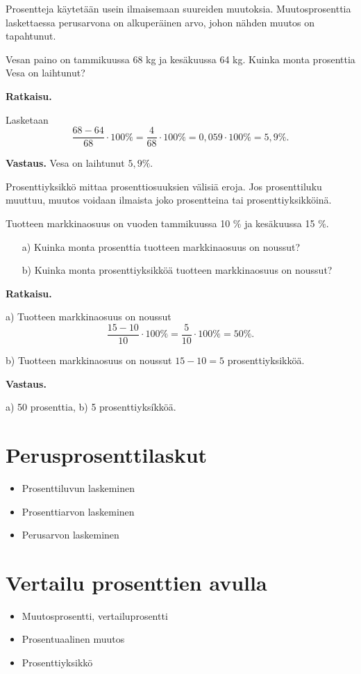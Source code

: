 Prosentteja käytetään usein ilmaisemaan suureiden muutoksia. Muutosprosenttia laskettaessa perusarvona on alkuperäinen arvo, johon nähden muutos on tapahtunut.

\begin{esimerkki}
    Vesan paino on tammikuussa 68 kg ja kesäkuussa 64 kg. Kuinka monta prosenttia Vesa on laihtunut?

    {\bf Ratkaisu.}

    Lasketaan 
    \[
    \frac{68-64}{68}\cdot 100\% = \frac{4}{68} \cdot 100\%=0,059\cdot 100\% =5,9\%.
    \]
    
    {\bf Vastaus.}
    Vesa on laihtunut $5,9\%$.
\end{esimerkki}


Prosenttiyksikkö mittaa prosenttiosuuksien välisiä eroja. Jos prosenttiluku muuttuu, muutos voidaan ilmaista joko prosentteina tai prosenttiyksikköinä.


\begin{esimerkki}
    Tuotteen markkinaosuus on vuoden tammikuussa 10 \% ja kesäkuussa 15 \%. 
    \begin{enumerate}
    \item[a)]
    Kuinka monta prosenttia tuotteen markkinaosuus on noussut?
    
    \item[b)] Kuinka monta prosenttiyksikköä tuotteen markkinaosuus on noussut?
    \end{enumerate}
    
    {\bf Ratkaisu.} 
    
    a) Tuotteen markkinaosuus on noussut
    \[
    \frac{15-10}{10} \cdot 100 \%= \frac{5}{10}\cdot 100\% = 50\%.
    \]
    
    b) Tuotteen markkinaosuus on noussut $15-10=5$ prosenttiyksikköä. 
    
    {\bf Vastaus.}
    
    a) 50 prosenttia, b) 5 prosenttiyksíkköä.
\end{esimerkki}




\section{Perusprosenttilaskut}

\begin{itemize}
	\item Prosenttiluvun laskeminen
	\item Prosenttiarvon laskeminen
	\item Perusarvon laskeminen
\end{itemize}

\section{Vertailu prosenttien avulla}

\begin{itemize}
	\item Muutosprosentti, vertailuprosentti
	\item Prosentuaalinen muutos
	\item Prosenttiyksikkö
\end{itemize}
